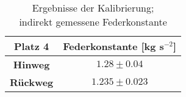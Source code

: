 \begin{table}[H]
			\centering
			\caption[Ergebnisse der Kalibrierung]{Ergebnisse der Kalibrierung; \\indirekt gemessene Federkonstante}
			\begin{tabular}{|c|c|}
				\hline
				Platz 4 & \textbf{Federkonstante} [kg s$ ^{-2} $]\\
				\hline
				\textbf{Hinweg} &  $ 1.28\pm 0.04 $\\
				\hline
				\textbf{Rückweg} & $ 1.235 \pm 0.023 $ \\
				\hline
			\end{tabular}
			\label{tab: Federkonstante}
		\end{table}
